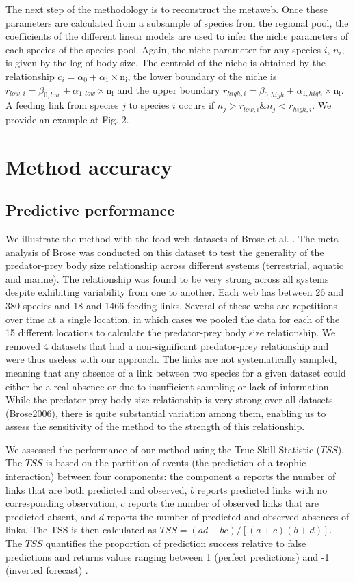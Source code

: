 \documentclass[12pt]{article}
\begin{document}
The next step of the methodology is to reconstruct the metaweb. Once these parameters are calculated from a subsample of species from the regional pool, the coefficients of the different linear models are used to infer the niche parameters of each species of the species pool. Again, the niche parameter for any species $i$, $n_i$, is given by the log of body size. The centroid of the niche is obtained by the relationship $c_i = \alpha_0 + \alpha_1\times\mathrm{n_i}$, the lower boundary of the niche is $r_{low,i} = \beta_{0,low} + \alpha_{1,low}\times\mathrm{n_i}$ and the upper boundary $r_{high,i} = \beta_{0,high} + \alpha_{1,high}\times\mathrm{n_i}$. A feeding link from species $j$ to species $i$ occurs if $n_j > r_{low,i} \& n_j < r_{high,i}$. We provide an example at Fig. 2.

\section{Method accuracy}
\subsection{Predictive performance}
We illustrate the method with the food web datasets of Brose et al. \parencite{Brose2005}. The meta-analysis of Brose \parencite{Brose2006} was conducted on this dataset to test the generality of the predator-prey body size relationship across different systems (terrestrial, aquatic and marine). The relationship was found to be very strong across all systems despite exhibiting variability from one to another. Each web has between 26 and 380 species and 18 and 1466 feeding links. Several of these webs are repetitions over time at a single location, in which cases we pooled the data for each of the 15 different locations to calculate the predator-prey body size relationship. We removed 4 datasets that had a non-significant predator-prey relationship and were thus useless with our approach. The links are not systematically sampled, meaning that any absence of a link between two species for a given dataset could either be a real absence or due to insufficient sampling or lack of information. While the predator-prey body size relationship is very strong over all datasets (Brose2006), there is quite substantial variation among them, enabling us to assess the sensitivity of the method to the strength of this relationship. 

We assessed the performance of our method using the True Skill Statistic ($TSS$). The $TSS$ is based on the partition of events (the prediction of a trophic interaction) between four components: the component $a$ reports the number of links that are both predicted and observed, $b$ reports predicted links with no corresponding observation, $c$ reports the number of observed links that are  predicted absent, and $d$ reports the number of predicted and observed absences of links. The TSS is then calculated as $TSS =(ad-bc)/\left[(a+c)(b+d)\right]$. The $TSS$ quantifies the proportion of prediction success relative to false predictions and returns values ranging between 1 (perfect predictions) and -1 (inverted forecast) \parencite{Allouche2006}. 
\end{document}
